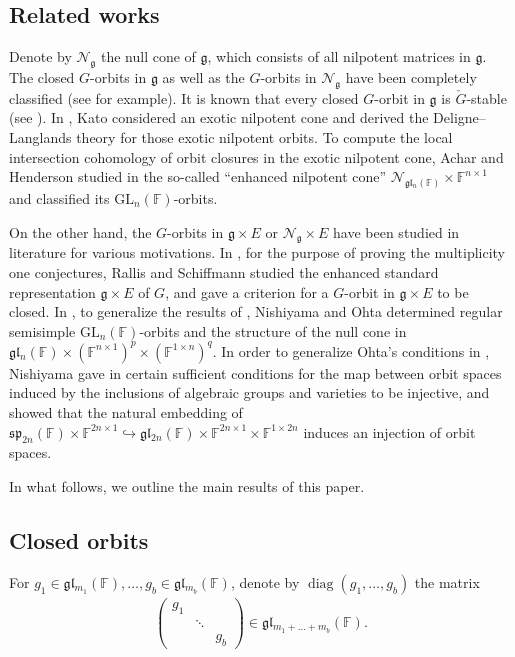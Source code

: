 \documentclass[12pt]{amsart}
\theoremstyle{definition}
\theoremstyle{remark}\newtheorem{rmk}[lm]{Remark}
\newcommand{\CN}{{\mathcal {N}}}
\newcommand{\GL}{{\mathrm{GL}}}
\newcommand{\diag}{\operatorname{diag}}
\newcommand{\g}{\mathfrak g}
\newcommand{\gl}{\mathfrak g \mathfrak l}
\renewcommand{\sp}{\mathfrak s \mathfrak p}
\newcommand{\C}{\mathbb{F}}
\begin{document}
  \subsection{Related works}
     Denote by $\CN_{\g}$ the null cone of $\g$, which consists of all nilpotent matrices in $\g$. The closed $G$-orbits in $\g$ as well as the $G$-orbits in $\CN_{\g}$ have been completely classified (see \cite{CM} for example). It is known that every  closed $G$-orbit in $\g$ is $\check{G}$-stable (see \cite{MVW}). In \cite{Kato}, Kato considered an exotic nilpotent cone and derived the Deligne–Langlands theory for those exotic nilpotent orbits. To compute the local intersection cohomology of orbit closures in the exotic nilpotent cone, Achar and Henderson studied in \cite{AH08} the so-called ``enhanced nilpotent cone'' $\CN_{\gl_n(\C)}\times\C^{n\times 1}$ and classified its $\GL_n(\C)$-orbits.

  On the other hand, the  $G$-orbits in $\g\times E$ or $\CN_\g\times E$ have been studied in literature for various motivations. 
In \cite{RS}, for the purpose of proving the multiplicity one conjectures, Rallis and Schiffmann  studied the enhanced standard representation $\g\times E$ of $G$, and gave a criterion for a $G$-orbit in $\g\times E$ to be closed. In \cite{NO}, to generalize the results of \cite{Kato,AH08}, Nishiyama and Ohta determined regular semisimple $\GL_n(\C)$-orbits and the structure of the null cone in $\gl_n(\C)\times\left(\C^{n\times 1}\right)^p\times\left(\C^{1\times n}\right)^q$. In order to  generalize Ohta's conditions in \cite{Oht}, Nishiyama gave in \cite{Nis14} certain sufficient conditions for the map between orbit spaces induced by the inclusions of algebraic groups and varieties to be injective, and showed that the natural embedding of $\sp_{2n}(\C)\times\C^{2n\times 1}\hookrightarrow\gl_{2n}(\C)\times\C^{2n\times 1}\times\C^{1\times 2n}$ induces an injection of orbit spaces.

In what follows, we outline the main results of this paper. 
 
	\subsection{Closed orbits}
	\label{sec:closed}
	For $g_1\in\gl_{m_1}(\C),\dots,g_b\in\gl_{m_b}(\C)$, denote by $\diag(g_1,\dots,g_b)$ the matrix
	\begin{equation*}
		\begin{matrix}
			\left(\begin{matrix}
				g_1&&\\&\ddots&\\&&g_b
			\end{matrix}\right)\in\gl_{m_1+\dots+m_b}(\C).
		\end{matrix}
	\end{equation*}
	
\end{document}
